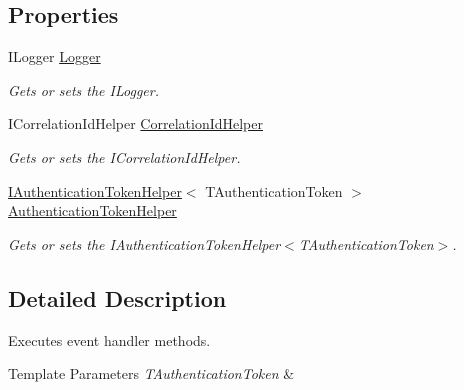\subsection*{Properties}
\begin{DoxyCompactItemize}
\item 
I\+Logger \hyperlink{classCqrs_1_1Akka_1_1Events_1_1AkkaEventHandler_af9ccf9b06321f7cbb21934e83005346e_af9ccf9b06321f7cbb21934e83005346e}{Logger}
\begin{DoxyCompactList}\small\item\em Gets or sets the I\+Logger. \end{DoxyCompactList}\item 
I\+Correlation\+Id\+Helper \hyperlink{classCqrs_1_1Akka_1_1Events_1_1AkkaEventHandler_a711ada6cc5e9fea454983378f6d5f109_a711ada6cc5e9fea454983378f6d5f109}{Correlation\+Id\+Helper}
\begin{DoxyCompactList}\small\item\em Gets or sets the I\+Correlation\+Id\+Helper. \end{DoxyCompactList}\item 
\hyperlink{interfaceCqrs_1_1Authentication_1_1IAuthenticationTokenHelper}{I\+Authentication\+Token\+Helper}$<$ T\+Authentication\+Token $>$ \hyperlink{classCqrs_1_1Akka_1_1Events_1_1AkkaEventHandler_a6ab1be5352fea3cad8f8599ab31c0ab6_a6ab1be5352fea3cad8f8599ab31c0ab6}{Authentication\+Token\+Helper}
\begin{DoxyCompactList}\small\item\em Gets or sets the I\+Authentication\+Token\+Helper$<$\+T\+Authentication\+Token$>$. \end{DoxyCompactList}\end{DoxyCompactItemize}


\subsection{Detailed Description}
Executes event handler methods. 


\begin{DoxyTemplParams}{Template Parameters}
{\em T\+Authentication\+Token} & \\
\hline
\end{DoxyTemplParams}



